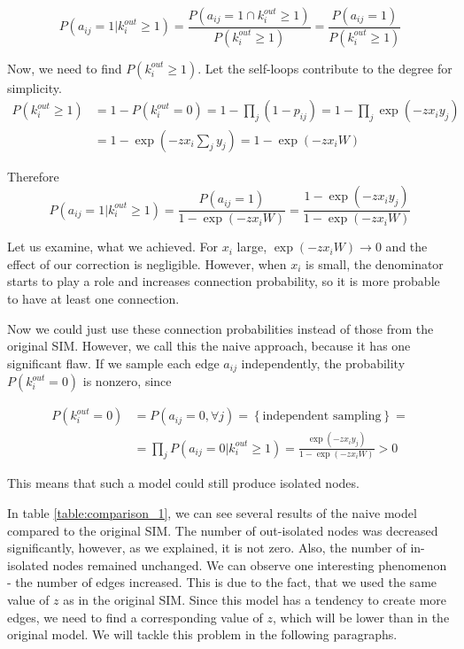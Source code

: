 \begin{equation}
    P(a_{ij}=1|k_i^{out}\geq 1) = \frac{P(a_{ij}=1 \cap k_i^{out}\geq 1)}{P(k_i^{out}\geq 1)} = \frac{P(a_{ij}=1)}{P(k_i^{out}\geq 1)}
\end{equation}

Now, we need to find $P(k_i^{out}\geq 1)$. Let the self-loops contribute to the degree for simplicity.
\begin{align}
    P(k_i^{out}\geq 1) &= 1-P(k_i^{out}=0) = 1 - \prod_j(1-p_{ij}) = 1 - \prod_j\exp(-zx_i y_j) \\
    &= 1 - \exp(-zx_i\sum_j y_j) = 1 - \exp(-zx_i W)
\end{align}

Therefore
\begin{equation}
    P(a_{ij}=1|k_i^{out}\geq 1) = \frac{P(a_{ij}=1)}{1 - \exp(-zx_i W)} = \frac{1-\exp(-zx_iy_j)}{1 - \exp(-zx_i W)}
    \label{eq:posterior_proba}
\end{equation}

Let us examine, what we achieved. For $x_i$ large, $\exp(-z x_i W) \to 0$ and the effect of our correction is negligible. However, when $x_i$ is small, the denominator starts to play a role and increases connection probability, so it is more probable to have at least one connection. 

Now we could just use these connection probabilities instead of those from the original SIM. However, we call this the naive approach, because it has one significant flaw. If we sample each edge $a_{ij}$ independently, the probability $P(k_i^{out}=0)$ is nonzero, since

\begin{align}
    P(k_i^{out}=0) &= P(a_{ij}=0, \forall j) = \left\{ \text{independent sampling} \right\} = \\ &= \prod_{j} P(a_{ij}=0|k_i^{out}\geq 1) = \frac{\exp(-zx_iy_j)}{1 - \exp(-zx_i W)} > 0
\end{align}

This means that such a model could still produce isolated nodes.

In table \ref*{table:comparison_1}, we can see several results of the naive model compared to the original SIM. The number of out-isolated nodes was decreased significantly, however, as we explained, it is not zero. Also, the number of in-isolated nodes remained unchanged. We can observe one interesting phenomenon - the number of edges increased. This is due to the fact, that we used the same value of $z$ as in the original SIM. Since this model has a tendency to create more edges, we need to find a corresponding value of $z$, which will be lower than in the original model. We will tackle this problem in the following paragraphs.

